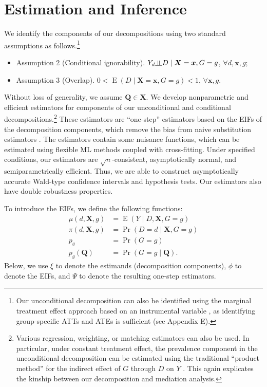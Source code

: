\documentclass[12pt,a4paper]{article}
\newcommand{\indep}{\rotatebox[origin=c]{90}{$\models$}}  %
\newcommand{\E}{\operatorname{E}}
\def\X{{\boldsymbol X}}
\def\x{{\boldsymbol x}}
\def\Q{{\boldsymbol Q}}
\DeclareMathOperator{\Pro}{Pr}
\begin{document}
\section{Estimation and Inference}
We identify the components of our decompositions using two standard assumptions as follows.\footnote{Our unconditional decomposition can also be identified using the marginal treatment effect approach based on an instrumental variable \citep{heckman_structural_2005, zhou_heterogeneous_2020}, as identifying group-specific ATTs and ATEs is sufficient (see Appendix E).}
\begin{itemize}
    \item[] Assumption 2 (Conditional ignorability). $Y_d \indep D \mid \X=\x, G=g$, $\forall d, \x, g$;
    \item[] Assumption 3 (Overlap). $0 < \E(D \mid \X=\x, G=g) <1$, $\forall \x, g$.
\end{itemize}
Without loss of generality, we assume $\Q \in \X$. 
We develop nonparametric and efficient estimators for components of our unconditional and conditional decompositions.\footnote{Various regression, weighting, or matching estimators can also be used. In particular, under constant treatment effect, the prevalence component in the unconditional decomposition can be estimated using the traditional ``product method'' for the indirect effect of $G$ through $D$ on $Y$ \citep{baron_moderator-mediator_1986}. This again explicates the kinship between our decomposition and mediation analysis. }
These estimators are ``one-step'' estimators based on the EIFs of the decomposition components, which remove the bias from naive substitution estimators \citep{bickel_efficient_1998, van_der_vaart_asymptotic_2000,hines_demystifying_2022}. The estimators contain some nuisance functions, which can be estimated using flexible ML methods coupled with cross-fitting. Under specified conditions, our estimators are $\sqrt{n}$-consistent, asymptotically normal, and semiparametrically efficient. Thus, we are able to construct asymptotically accurate Wald-type confidence intervals and hypothesis tests. Our estimators also have double robustness properties.  

To introduce the EIFs, we define the following functions:
\begin{align*}
    \mu(d,\X, g)&=\E(Y \mid D, \X, G=g) \\
    \pi(d,\X, g) &= \Pro(D=d \mid \X, G=g) \\
    p_g &= \Pro(G=g) \\
    p_g(\Q) &= \Pro(G=g \mid \Q).
\end{align*}
Below, we use $\xi$ to denote the estimands (decomposition components), $\phi$ to denote the EIFs, and $\Psi$ to denote the resulting one-step estimators. 
\end{document}
